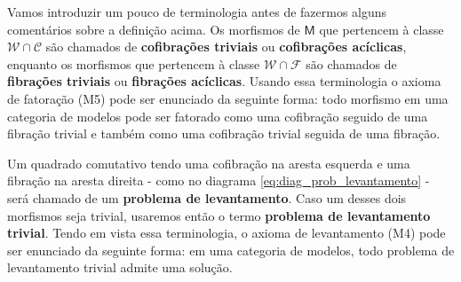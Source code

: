 Vamos introduzir um pouco de terminologia antes de fazermos alguns comentários sobre a definição acima.
Os morfismos de $\mathsf{M}$ que pertencem à classe $\mathcal{W} \cap \mathcal{C}$ são chamados de \textbf{cofibrações triviais} ou \textbf{cofibrações acíclicas}, enquanto os morfismos que pertencem à classe $\mathcal{W} \cap \mathcal{F}$ são chamados de \textbf{fibrações triviais} ou \textbf{fibrações acíclicas}.
Usando essa terminologia o axioma de fatoração (M5) pode ser enunciado da seguinte forma: todo morfismo em uma categoria de modelos pode ser fatorado como uma cofibração seguido de uma fibração trivial e também como uma cofibração trivial seguida de uma fibração.

Um quadrado comutativo tendo uma cofibração na aresta esquerda e uma fibração na aresta direita - como no diagrama \eqref{eq:diag_prob_levantamento} - será chamado de um \textbf{problema de levantamento}.
Caso um desses dois morfismos seja trivial, usaremos então o termo \textbf{problema de levantamento trivial}.
Tendo em vista essa terminologia, o axioma de levantamento (M4) pode ser enunciado da seguinte forma: em uma categoria de modelos, todo problema de levantamento trivial admite uma solução.

